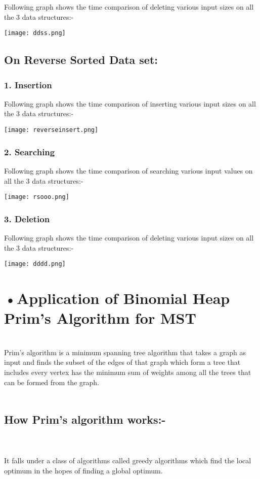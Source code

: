 Following graph shows the time comparison of deleting various input sizes on all the 3 data structures:-


\texttt{[image: ddss.png]} 

\subsection*{On Reverse Sorted Data set:}

\subsubsection*{1. Insertion}

Following graph shows the time comparison of inserting various input sizes on all the 3 data structures:-
 

\texttt{[image: reverseinsert.png]}  

\subsubsection*{2. Searching}

Following graph shows the time comparison of searching various input values on all the 3 data structures:-


\texttt{[image: rsooo.png]}  

\subsubsection*{3. Deletion}

Following graph shows the time comparison of deleting various input sizes on all the 3 data structures:-


\texttt{[image: dddd.png]} 


\section*{•Application of Binomial Heap \\ Prim's Algorithm for MST} \\
	Prim's algorithm is a minimum spanning tree algorithm that takes a graph as input and finds the subset of the edges of that graph which form a tree that includes every vertex
has the minimum sum of weights among all the trees that can be formed from the graph.\\ \\

\subsection*{How Prim's algorithm works:-}\\ \\ 
	It falls under a class of algorithms called greedy algorithms which find the local optimum in the hopes of finding a global optimum.

